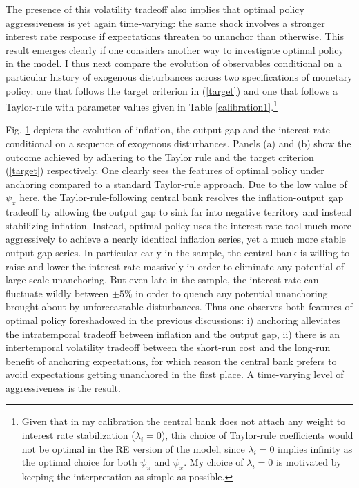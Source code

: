 \documentclass[11pt]{article}
\def \myFigPath {../../figures/}
\renewcommand{\[}{\begin{equation}}
\renewcommand{\]}{\end{equation}}
\begin{document}
The presence of this volatility tradeoff also implies that optimal policy aggressiveness is yet again time-varying: the same shock involves a stronger interest rate response if expectations threaten to unanchor than otherwise. This result emerges clearly if one considers another way to investigate optimal policy in the model. I thus next compare the evolution of observables conditional on a particular history of exogenous disturbances across two specifications of monetary policy: one that follows the target criterion in (\ref{target}) and one that follows a Taylor-rule with parameter values given in Table \ref{calibration1}.\footnote{Given that in my calibration the central bank does not attach any weight to interest rate stabilization ($\lambda_i=0$), this choice of Taylor-rule coefficients would not be optimal in the RE version of the model, since $\lambda_i=0$ implies infinity as the optimal choice for both $\psi_{\pi}$ and $\psi_x$. My choice of $\lambda_i=0$ is motivated by keeping the interpretation as simple as possible.}

\begin{figure}[h!]
\hfill %
\caption{}
\label{pea_TCvsTR}
\end{figure}

Fig. \ref{pea_TCvsTR} depicts the evolution of inflation, the output gap and the interest rate conditional on a sequence of exogenous disturbances. Panels (a) and (b) show the outcome achieved by adhering to the Taylor rule and the target criterion (\ref{target}) respectively. One clearly sees the features of optimal policy under anchoring compared to a standard Taylor-rule approach. Due to the low value of $\psi_x$ here, the Taylor-rule-following central bank resolves the inflation-output gap tradeoff by allowing the output gap to sink far into negative territory and instead stabilizing inflation. Instead, optimal policy uses the interest rate tool much more aggressively to achieve a nearly identical inflation series, yet a much more stable output gap series. In particular early in the sample, the central bank is willing to raise and lower the interest rate massively in order to eliminate any potential of large-scale unanchoring. But even late in the sample, the interest rate can fluctuate wildly between $\pm5\%$ in order to quench any potential unanchoring brought about by unforecastable disturbances. Thus one observes both features of optimal policy foreshadowed in the previous discussions: i) anchoring alleviates the intratemporal tradeoff between inflation and the output gap, ii) there is an intertemporal volatility tradeoff between the short-run cost and the long-run benefit of anchoring expectations, for which reason the central bank prefers to avoid expectations getting unanchored in the first place. A time-varying level of aggressiveness is the result.
\end{document}
